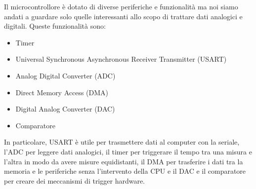 Il microcontrollore è dotato di diverse periferiche e funzionalità ma noi siamo andati a guardare solo quelle interessanti allo scopo di trattare dati analogici e digitali. Queste funzionalità sono:
\begin{itemize}
    \item Timer
    \item Universal Synchronous Asynchronous Receiver Transmitter (USART)
    \item Analog Digital Converter (ADC)
    \item Direct Memory Access (DMA)
    \item Digital Analog Converter (DAC)
    \item Comparatore
\end{itemize}
In particolare, USART è utile per trasmettere dati al computer con la seriale, l'ADC per leggere dati analogici, il timer per triggerare il tempo tra una misura e l'altra in modo da avere misure equidistanti, il DMA per trasferire i dati tra la memoria e le periferiche senza l'intervento della CPU e il DAC e il comparatore per creare dei meccanismi di trigger hardware.













